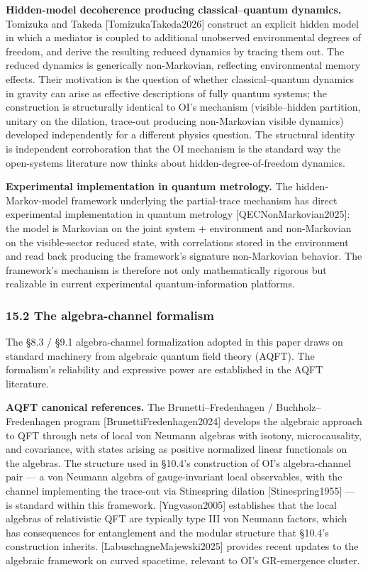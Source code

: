 \documentclass[
]{article}
\begin{document}
\textbf{Hidden-model decoherence producing classical--quantum dynamics.}
Tomizuka and Takeda {[}TomizukaTakeda2026{]} construct an explicit
hidden model in which a mediator is coupled to additional unobserved
environmental degrees of freedom, and derive the resulting reduced
dynamics by tracing them out. The reduced dynamics is generically
non-Markovian, reflecting environmental memory effects. Their motivation
is the question of whether classical--quantum dynamics in gravity can
arise as effective descriptions of fully quantum systems; the
construction is structurally identical to OI's mechanism
(visible--hidden partition, unitary on the dilation, trace-out producing
non-Markovian visible dynamics) developed independently for a different
physics question. The structural identity is independent corroboration
that the OI mechanism is the standard way the open-systems literature
now thinks about hidden-degree-of-freedom dynamics.

\textbf{Experimental implementation in quantum metrology.} The
hidden-Markov-model framework underlying the partial-trace mechanism has
direct experimental implementation in quantum metrology
{[}QECNonMarkovian2025{]}: the model is Markovian on the joint system +
environment and non-Markovian on the visible-sector reduced state, with
correlations stored in the environment and read back producing the
framework's signature non-Markovian behavior. The framework's mechanism
is therefore not only mathematically rigorous but realizable in current
experimental quantum-information platforms.

\hypertarget{the-algebra-channel-formalism}{%
\subsubsection{15.2 The algebra-channel
formalism}\label{the-algebra-channel-formalism}}

The §8.3 / §9.1 algebra-channel formalization adopted in this paper
draws on standard machinery from algebraic quantum field theory (AQFT).
The formalism's reliability and expressive power are established in the
AQFT literature.

\textbf{AQFT canonical references.} The Brunetti--Fredenhagen /
Buchholz--Fredenhagen program {[}BrunettiFredenhagen2024{]} develops the
algebraic approach to QFT through nets of local von Neumann algebras
with isotony, microcausality, and covariance, with states arising as
positive normalized linear functionals on the algebras. The structure
used in §10.4's construction of OI's algebra-channel pair --- a von
Neumann algebra of gauge-invariant local observables, with the channel
implementing the trace-out via Stinespring dilation
{[}Stinespring1955{]} --- is standard within this framework.
{[}Yngvason2005{]} establishes that the local algebras of relativistic
QFT are typically type III von Neumann factors, which has consequences
for entanglement and the modular structure that §10.4's construction
inherits. {[}LabuschagneMajewski2025{]} provides recent updates to the
algebraic framework on curved spacetime, relevant to OI's GR-emergence
cluster.
\end{document}
